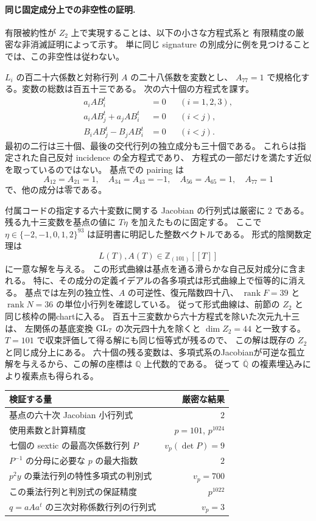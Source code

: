 \paragraph{同じ固定成分上での非空性の証明.}
有限被約性が $Z_2$ 上で実現することは、以下の小さな方程式系と
有限精度の厳密な非消滅証明によって示す。
単に同じ signature の別成分に例を見つけることでは、この非空性は従わない。

$L_i$ の百二十六係数と対称行列 $A$ の二十八係数を変数とし、
$A_{77}=1$ で規格化する。変数の総数は百五十三である。
次の六十個の方程式を課す。
\begin{align*}
 a_i A B_i^t&=0 &&(i=1,2,3),\\
 a_i A B_j^t+a_j A B_i^t&=0 &&(i<j),\\
 B_i A B_j^t-B_j A B_i^t&=0 &&(i<j).
\end{align*}
最初の二行は三十個、最後の交代行列の独立成分も三十個である。
これらは指定された自己反対 incidence の全方程式であり、
方程式の一部だけを満たす近似を取っているのではない。
基点での pairing は
\[
 A_{12}=A_{21}=1,\quad
 A_{34}=A_{43}=-1,\quad
 A_{56}=A_{65}=1,\quad A_{77}=1
\]
で、他の成分は零である。

付属コードの指定する六十変数に関する Jacobian の行列式は厳密に $2$ である。
残る九十三変数を基点の値に $T\eta$ を加えたものに固定する。
ここで $\eta\in\{-2,-1,0,1,2\}^{93}$ は証明書に明記した整数ベクトルである。
形式的陰関数定理は
\[
 L(T),A(T)\in\mathbb Z_{(101)}[[T]]
\]
に一意な解を与える。
この形式曲線は基点を通る滑らかな自己反対成分に含まれる。
特に、その成分の定義イデアルの各多項式は形式曲線上で恒等的に消える。
基点では左列の独立性、$A$ の可逆性、復元階数四十八、
$\operatorname{rank}F=39$ と $\operatorname{rank}N=36$ の単位小行列を確認している。
従って形式曲線は、前節の $Z_2$ と同じ核枠の開chartに入る。
百五十三変数から六十方程式を除いた次元九十三は、
左関係の基底変換 $\operatorname{GL}_7$ の次元四十九を除くと $\dim Z_2=44$ と一致する。
$T=101$ で収束評価して得る解にも同じ恒等式が残るので、
この解は既存の $Z_2$ と同じ成分上にある。
六十個の残る変数は、多項式系のJacobianが可逆な孤立解を与えるから、この解の座標は
$\mathbb Q$ 上代数的である。
従って $\overline{\mathbb Q}$ の複素埋込みにより複素点も得られる。

\begin{center}
\begin{tabular}{lr}
検証する量&厳密な結果\\\hline
基点の六十次 Jacobian 小行列式&$2$\\
使用素数と計算精度&$p=101$, $p^{1024}$\\
七個の sextic の最高次係数行列 $P$&$v_p(\det P)=9$\\
$P^{-1}$ の分母に必要な $p$ の最大指数&$2$\\
$p^2y$ の乗法行列の特性多項式の判別式&$v_p=700$\\
この乗法行列と判別式の保証精度&$p^{1022}$\\
$q=aAa^t$ の三次対称係数行列の行列式&$v_p=3$
\end{tabular}
\end{center}

